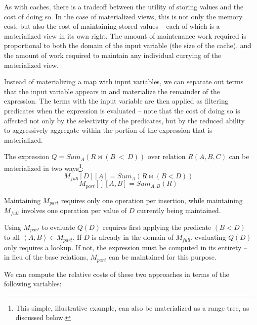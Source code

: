 As with caches, there is a tradeoff between the utility of storing values and the cost of doing so.  In the case of materialized views, this is not only the memory cost, but also the cost of maintaining stored values -- each of which is a materialized view in its own right.  The amount of maintenance work required is proportional to both the domain of the input variable (the size of the cache), and the amount of work required to maintain any individual currying of the materialized view.  

Instead of materializing a map with input variables, we can separate out terms that the input variable appears in and materialize the remainder of the expression.  The terms with the input variable are then applied as filtering predicates when the expression is evaluated -- note that the cost of doing so is  affected not only by the selectivity of the predicates, but by the reduced ability to aggressively aggregate within the portion of the expression that is materialized.

\begin{example}
The expression $Q = Sum_A(R \bowtie (B~<~D))$ over relation $R(A,B,C)$ can be materialized in two ways\footnote{This simple, illustrative example, can also be materialized as a range tree, as discussed below.}:
$$M_{full}[D][A] = Sum_A(R \bowtie (B < D))$$
$$M_{part}[][A,B] = Sum_{A,B}(R)$$
\end{example}

Maintaining $M_{part}$ requires only one operation per insertion, while maintaining $M_{full}$ involves one operation per value of $D$ currently being maintained.  

Using $M_{part}$ to evaluate $Q(D)$ requires first applying the predicate $(B < D)$ to all $\left<A,B\right> \in M_{part}$.  If $D$ is already in the domain of $M_{full}$, evaluating $Q(D)$ only requires a lookup.  If not, the expression must be computed in its entirety -- in lieu of the base relations, $M_{part}$ can be maintained for this purpose.

We can compute the relative costs of these two approaches in terms of the following variables:


